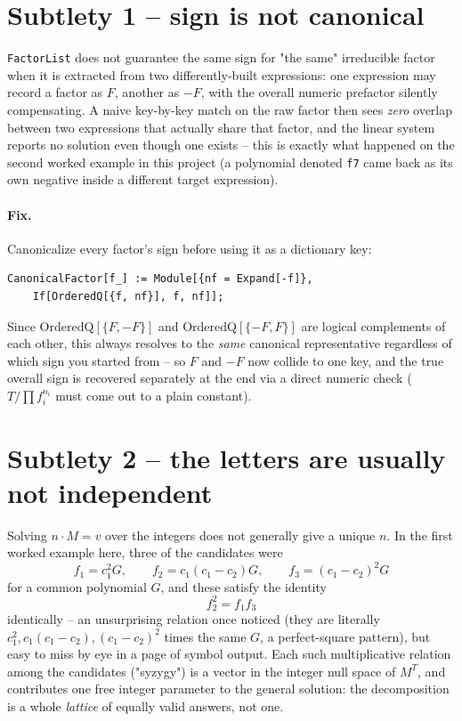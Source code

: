 \documentclass[11pt]{article}
\newcommand{\code}[1]{\texttt{#1}}
\begin{document}
\section{Subtlety 1 -- sign is not canonical}

\code{FactorList} does not guarantee the same sign for "the same" irreducible factor when it is extracted from two differently-built expressions: one expression may record a factor as $F$, another as $-F$, with the overall numeric prefactor silently compensating. A naive key-by-key match on the raw factor then sees \emph{zero} overlap between two expressions that actually share that factor, and the linear system reports no solution even though one exists -- this is exactly what happened on the second worked example in this project (a polynomial denoted \code{f7} came back as its own negative inside a different target expression).

\paragraph{Fix.} Canonicalize every factor's sign before using it as a dictionary key:
\begin{lstlisting}
CanonicalFactor[f_] := Module[{nf = Expand[-f]},
    If[OrderedQ[{f, nf}], f, nf]];
\end{lstlisting}
Since $\mathrm{OrderedQ}[\{F,-F\}]$ and $\mathrm{OrderedQ}[\{-F,F\}]$ are logical complements of each other, this always resolves to the \emph{same} canonical representative regardless of which sign you started from -- so $F$ and $-F$ now collide to one key, and the true overall sign is recovered separately at the end via a direct numeric check ($T/\prod f_i^{n_i}$ must come out to a plain constant).

\section{Subtlety 2 -- the letters are usually not independent}

Solving $n\cdot M = v$ over the integers does not generally give a unique $n$. In the first worked example here, three of the candidates were
\[
  f_1 = c_1^2 G,\qquad f_2 = c_1(c_1-c_2)G,\qquad f_3=(c_1-c_2)^2G
\]
for a common polynomial $G$, and these satisfy the identity
\[
  f_2^2 = f_1 f_3
\]
identically -- an unsurprising relation once noticed (they are literally $c_1^2, c_1(c_1-c_2), (c_1-c_2)^2$ times the same $G$, a perfect-square pattern), but easy to miss by eye in a page of symbol output. Each such multiplicative relation among the candidates ("syzygy") is a vector in the integer null space of $M^{T}$, and contributes one free integer parameter to the general solution: the decomposition is a whole \emph{lattice} of equally valid answers, not one.
\end{document}
